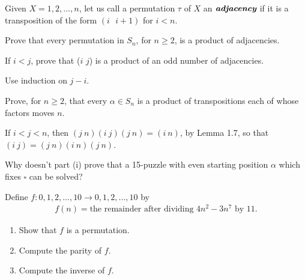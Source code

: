 \documentclass[12pt]{article}
\newenvironment{exercise}[2][Exercise]{\begin{trivlist}
\item[\hskip \labelsep {\bfseries #1}\hskip \labelsep {\bfseries #2.}]}
{\end{trivlist}}
\newenvironment{hint}[2][Hint]{\begin{trivlist}
    \item[\hskip \labelsep {\bfseries #1}\hskip \labelsep {\bfseries #2.}]}
    {\end{trivlist}}
\begin{document}
\begin{exercise}{1.16}

    Given $X={1,2,...,n}$, let us call a permutation $\tau$ of $X$ an $\textit{\textbf{adjacency}}$ if it is a transposition of the form $(i \text{ }i+1)$ for $i<n$.
    \begin{enumerate}
        \item[(i)] Prove that every permutation in $S_n$, for $n\geq2$, is a product of adjacencies.
        \item[(ii)] If $i<j$, prove that ($i$ $j$) is a product of an odd number of adjacencies.
        \begin{hint}{}
            Use induction on $j-i$.
        \end{hint}
    \end{enumerate}

    
\end{exercise}



\begin{exercise}{1.17}
    \begin{enumerate}
        \item[(i)] Prove, for $n\geq2$, that every $\alpha\in S_n$ is a product of transpositions each of whose factors moves $n$.
        \begin{hint}{} 
            If $i<j<n$, then $(j\:n)(i\:j)(j\:n) = (i\:n)$, by Lemma 1.7, so that $(i\:j) = (j\:n)(i\:n)(j\:n)$.
        \end{hint}
        \item[(ii)] Why doesn't part (i) prove that a 15-puzzle with even starting position $\alpha$ which fixes $\square$ can be solved?
    \end{enumerate}
    
\end{exercise}


\begin{exercise}{1.18}
    Define $f:{0,1,2,...,10} \rightarrow {0,1,2,...,10}$ by 
    \begin{align*}
        f(n)= \text{the remainder after dividing } 4n^2-3n^7 \text{ by 11.}
    \end{align*}

    \begin{enumerate}
        \item[(i)] Show that $f$ is a permutation.
        \item[(ii)] Compute the parity of $f$.
        \item[(iii)] Compute the inverse of $f$.
    \end{enumerate}
    
\end{exercise}
\end{document}

